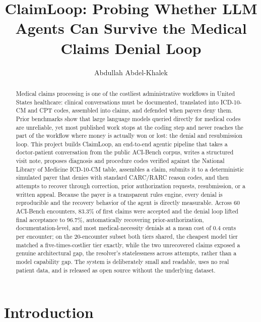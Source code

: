 \documentclass[sigconf,nonacm]{acmart}
\begin{document}
\title{ClaimLoop: Probing Whether LLM Agents Can Survive the Medical Claims Denial Loop}

\author{Abdullah Abdel-Khalek}

\begin{abstract}
Medical claims processing is one of the costliest administrative workflows in
United States healthcare: clinical conversations must be documented, translated
into ICD-10-CM and CPT codes, assembled into claims, and defended when payers
deny them. Prior benchmarks show that large language models queried directly
for medical codes are unreliable, yet most published work stops at the coding
step and never reaches the part of the workflow where money is actually won or
lost: the denial and resubmission loop. This project builds ClaimLoop, an
end-to-end agentic pipeline that takes a doctor-patient conversation from the
public ACI-Bench corpus, writes a structured visit note, proposes diagnosis
and procedure codes verified against the National Library of Medicine
ICD-10-CM table, assembles a claim, submits it to a deterministic simulated
payer that denies with standard CARC/RARC reason codes, and then attempts to
recover through correction, prior authorization requests, resubmission, or a
written appeal. Because the payer is a transparent rules engine, every denial
is reproducible and the recovery behavior of the agent is directly measurable.
Across 60 ACI-Bench encounters, 83.3\% of first claims were accepted and the
denial loop lifted final acceptance to 96.7\%, automatically recovering
prior-authorization, documentation-level, and most medical-necessity denials
at a mean cost of 0.4 cents per encounter; on the 20-encounter subset both
tiers shared, the cheapest model tier matched a five-times-costlier tier
exactly, while the two unrecovered claims exposed a genuine architectural
gap, the resolver's statelessness across attempts, rather than a model
capability gap. The system is deliberately small and readable, uses no real
patient data, and is released as open source without the underlying dataset.
\end{abstract}

\maketitle

\section{Introduction}
\end{document}
